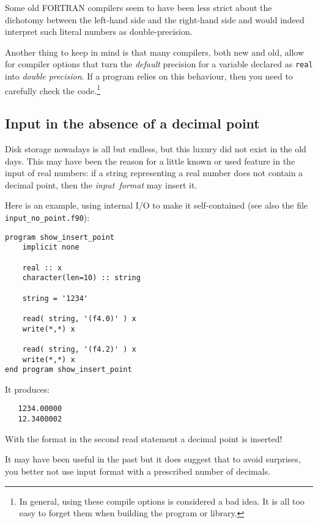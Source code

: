 Some old FORTRAN compilers seem to have been less strict about the dichotomy between
the left-hand side and the right-hand side and would indeed interpret such literal
numbers as double-precision.

Another thing to keep in mind is that many compilers, both new and old, allow for
compiler options that turn the \emph{default} precision for a variable declared as \verb+real+
into \emph{double precision}. If a program relies on this behaviour, then you need to
carefully check the code.\footnote{In general, using these compile options is
considered a bad idea. It is all too easy to forget them when building the program or library.}


\subsection{Input in the absence of a decimal point}
Disk storage nowadays is all but endless, but this luxury did not exist in the old days.
This may have been the reason for a little known or used feature in the input of real numbers:
if a string representing a real number does not contain a decimal point, then the \emph{input~format}
may insert it.

Here is an example, using internal I/O to make it self-contained (see also the file \verb+input_no_point.f90+):
\begin{verbatim}
program show_insert_point
    implicit none

    real :: x
    character(len=10) :: string

    string = '1234'

    read( string, '(f4.0)' ) x
    write(*,*) x

    read( string, '(f4.2)' ) x
    write(*,*) x
end program show_insert_point
\end{verbatim}
It produces:
\begin{verbatim}
   1234.00000
   12.3400002
\end{verbatim}
With the format in the second read statement a decimal point is inserted!

It may have been useful in the past but it does suggest that to avoid surprises, you better not
use input format with a prescribed number of decimals.


